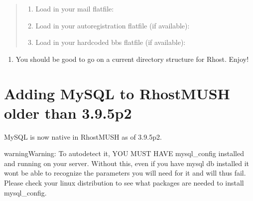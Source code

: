 \documentclass[letterpaper,10pt,english]{sphinxmanual}
\begin{document}
\begin{quote}
\begin{enumerate}
\end{enumerate}
\begin{enumerate}
%
\item {} 
\sphinxAtStartPar
Load in your mail flatfile:

\begin{sphinxVerbatim}[commandchars=\\\{\}]
\end{sphinxVerbatim}

\item {} 
\sphinxAtStartPar
Load in your autoregistration flatfile (if available):

\begin{sphinxVerbatim}[commandchars=\\\{\}]
\end{sphinxVerbatim}

\item {} 
\sphinxAtStartPar
Load in your hardcoded bbs flatfile (if available):

\begin{sphinxVerbatim}[commandchars=\\\{\}]
\end{sphinxVerbatim}

\end{enumerate}
\end{quote}
\begin{enumerate}
%
\item {} 
\sphinxAtStartPar
You should be good to go on a current directory structure for Rhost.  Enjoy!

\end{enumerate}


\section{Adding MySQL to RhostMUSH older than 3.9.5p2}
\label{\detokenize{legacy:adding-mysql-to-rhostmush-older-than-3-9-5p2}}
\sphinxAtStartPar
MySQL is now native in RhostMUSH as of 3.9.5p2.

\begin{sphinxadmonition}{warning}{Warning:}
\sphinxAtStartPar
To autodetect it, YOU MUST HAVE mysql\_config installed and running on your server.  Without this, even if you have mysql db installed it won\textquotesingle{}t be able to recognize the parameters you will need for it and will thus fail.  Please check your linux distribution to see what packages are needed to install mysql\_config.
\end{sphinxadmonition}
\end{document}
